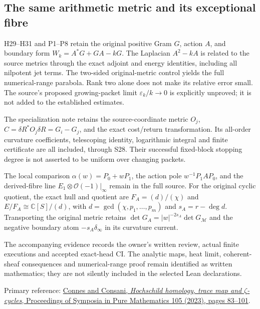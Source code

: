 \subsection{The same arithmetic metric and its exceptional fibre}

H29--H31 and P1--P8 retain the original positive Gram $G$, action
$A$, and boundary form $W_k=A^*G+GA-kG$. The Laplacian
$A^2-kA$ is related to the source metrics through the exact
adjoint and energy identities, including all nilpotent jet terms.
The two-sided original-metric control yields the full numerical-range
parabola. Rank two alone does not make its relative error small.
The source's proposed growing-packet limit $\varepsilon_k/k\to0$
is explicitly unproved; it is not added to the established estimates.

The specialization note retains the source-coordinate metric
$O_j$, $C=\delta R^*O_j\delta R=G_i-G_j$, and the exact
cost/return transformation. Its all-order curvature coefficients,
telescoping identity, logarithmic integral and finite certificate
are all included, through S28. Their successful fixed-block stopping
degree is not asserted to be uniform over changing packets.

The local comparison $\alpha(w)=P_0+wP_1$, the action pole
$w^{-1}P_1AP_0$, and the derived-fibre line
$E_1\otimes\mathcal O(-1)|_\infty$ remain in the full source.
For the original cyclic quotient, the exact hull and quotient are
$F_A=(d)/(\chi)$ and $E/F_A\cong\mathbb C[S]/(d)$, with
$d=\gcd(\chi,p_1,\ldots,p_m)$ and $s_A=r-\deg d$.
Transporting the original metric retains
$\det G_A=|w|^{-2s_A}\det G_{\mathscr M}$ and the negative
boundary atom $-s_A\delta_\infty$ in its curvature current.

The accompanying evidence records the owner's written review,
actual finite executions and accepted exact-head CI. The analytic
maps, heat limit, coherent-sheaf consequences and numerical-range
proof remain identified as written mathematics; they are not
silently included in the selected Lean declarations.

Primary reference:
\href{https://doi.org/10.1090/pspum/105/01896}
{Connes and Consani, \emph{Hochschild homology, trace map and
$\zeta$-cycles}, Proceedings of Symposia in Pure Mathematics 105
(2023), pages 83--101}.
